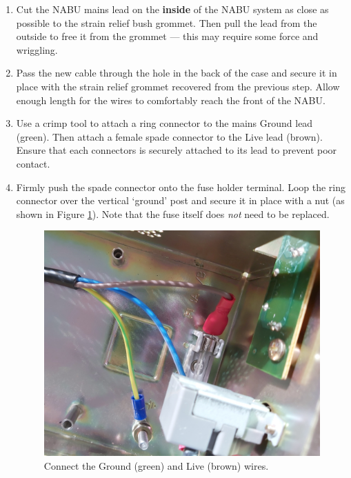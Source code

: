 \begin{enumerate}
	\item Cut the NABU mains lead on the \textbf{inside} of the NABU system as close as possible to the strain relief bush grommet. Then pull the lead from the outside to free it from the grommet --- this may require some force and wriggling.
	\item Pass the new cable through the hole in the back of the case and secure it in place with the strain relief grommet recovered from the previous step. Allow enough length for the wires to comfortably reach the front of the NABU.
	\item Use a crimp tool to attach a ring connector to the mains Ground lead (green). Then attach a female spade connector to the Live lead (brown). Ensure that each connectors is securely attached to its lead to prevent poor contact.
	\item Firmly push the spade connector onto the fuse holder terminal. Loop the ring connector over the vertical `ground' post and secure it in place with a nut (as shown in Figure \ref{fig:new}). Note that the fuse itself does \textit{not} need to be replaced.
	\begin{figure}[h!]
		\includegraphics[width=\columnwidth]{images/psu-image-2.jpg}
		\caption{Connect the Ground (green) and Live (brown) wires.}
		\label{fig:new}
	\end{figure}
\end{enumerate}
